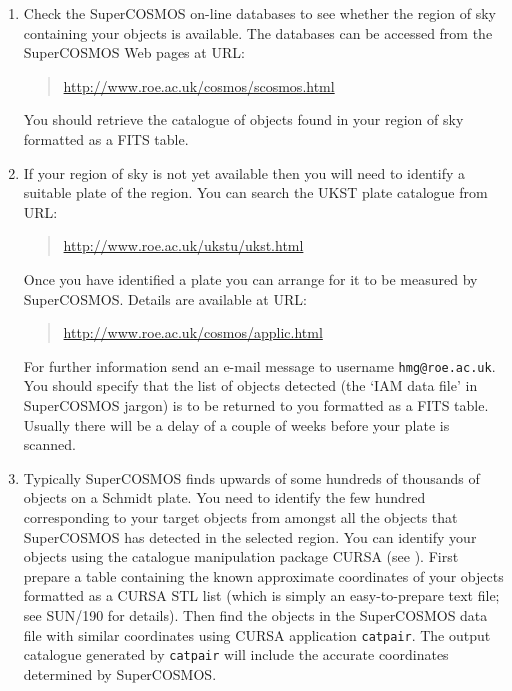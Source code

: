 \documentclass[twoside,11pt]{starlink}
\begin{document}
\begin{enumerate}

  \item Check the SuperCOSMOS on-line databases to see whether the
   region of sky containing your objects is available.  The databases
   can be accessed from the SuperCOSMOS Web pages at URL:

  \begin{quote}
\url{http://www.roe.ac.uk/cosmos/scosmos.html}
  \end{quote}

   You should retrieve the catalogue of objects found in your region
   of sky formatted as a FITS table.

  \item If your region of sky is not yet available then you will need to
   identify a suitable plate of the region.  You can search the UKST plate
   catalogue from URL:

  \begin{quote}
\url{http://www.roe.ac.uk/ukstu/ukst.html}
  \end{quote}

   Once you have identified a plate you can arrange for it to be measured
   by SuperCOSMOS.  Details are available at URL:

  \begin{quote}
\url{http://www.roe.ac.uk/cosmos/applic.html}
  \end{quote}

   For further information send an e-mail message to username \texttt{hmg@roe.ac.uk}.  You should specify that the list of objects
   detected (the `IAM data file' in SuperCOSMOS jargon) is to be
   returned to you formatted as a FITS table.  Usually there will be
   a delay of a couple of weeks before your plate is scanned.

  \item Typically SuperCOSMOS finds upwards of some hundreds of thousands
   of objects on a Schmidt plate.  You need to identify the few hundred
   corresponding to your target objects from amongst all the objects that
   SuperCOSMOS has detected in the selected region.  You can identify your
   objects using the catalogue manipulation package CURSA (see
   \cite{SUN190}).  First prepare a table
   containing the known approximate coordinates of your objects
   formatted as a CURSA STL list (which is simply an easy-to-prepare
   text file; see SUN/190 for details).  Then find the objects in the
   SuperCOSMOS data file with similar coordinates using CURSA application
   \texttt{catpair}.  The output catalogue generated by \texttt{catpair} will
   include the accurate coordinates determined by SuperCOSMOS.

\end{enumerate}
\end{document}
